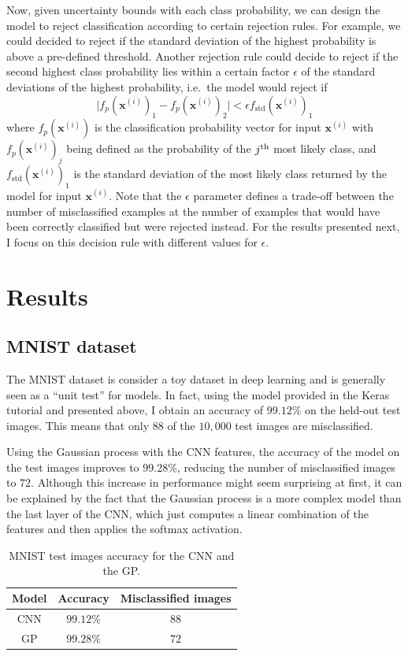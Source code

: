 \documentclass{article}
\begin{document}
Now, given uncertainty bounds with each class probability, we can design the model to reject classification according to certain rejection rules. For example, we could decided to reject if the standard deviation of the highest probability is above a pre-defined threshold. Another rejection rule could decide to reject if the second highest class probability lies within a certain factor $\epsilon$ of the standard deviations of the highest probability, i.e.\ the model would reject if
\begin{equation*}
	\vert f_p(\mathbf{x}^{(i)})_1 - f_p(\mathbf{x}^{(i)})_2 \vert < \epsilon f_{\textrm{std}}(\mathbf{x}^{(i)})_1
\end{equation*}
where $f_p(\mathbf{x}^{(i)})$ is the classification probability vector for input $\mathbf{x}^{(i)}$ with $f_p(\mathbf{x}^{(i)})_j$ being defined as the probability of the $j\textsuperscript{th}$ most likely class, and $f_{\textrm{std}}(\mathbf{x}^{(i)})_1$ is the standard deviation of the most likely class returned by the model for input $\mathbf{x}^{(i)}$. Note that the $\epsilon$ parameter defines a trade-off between the number of misclassified examples at the number of examples that would have been correctly classified but were rejected instead. For the results presented next, I focus on this decision rule with different values for $\epsilon$.
\section{Results}
\subsection{MNIST dataset}
The MNIST dataset is consider a toy dataset in deep learning and is generally seen as a ``unit test'' for models. In fact, using the model provided in the Keras tutorial and presented above, I obtain an accuracy of $99.12\%$ on the held-out test images. This means that only $88$ of the $10,000$ test images are misclassified.

Using the Gaussian process with the CNN features, the accuracy of the model on the test images improves to $99.28\%$, reducing the number of misclassified images to $72$. Although this increase in performance might seem surprising at first, it can be explained by the fact that the Gaussian process is a more complex model than the last layer of the CNN, which just computes a linear combination of the features and then applies the softmax activation.

\begin{table}[h]
\centering	
{\renewcommand{\arraystretch}{1.4} %
\begin{tabular}{ c | c c}
\textbf{Model} & \textbf{Accuracy} & \textbf{Misclassified images}\\
\hline
CNN & $99.12\%$ & $88$ \\
GP & $99.28\%$  & $72$\\
\end{tabular}
}
\caption{MNIST test images accuracy for the CNN and the GP.}
\label{table/mnist_acc}
\end{table}
\end{document}
